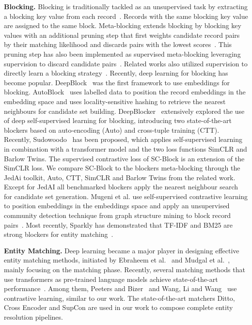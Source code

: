 \documentclass[sigconf,nonacm]{acmart}
\begin{document}
\vspace{.05cm}\noindent\textbf{Blocking.}
Blocking is traditionally tackled as an unsupervised task by extracting a blocking key value from each record~\cite{christen_survey_2012, aizawa_fast_2005}. Records with the same blocking key value are assigned to the same block. Meta-blocking extends blocking by blocking key values with an additional pruning step that first weights candidate record pairs by their matching likelihood and discards pairs with the lowest scores~\cite{efthymiou_parallel_2017}. This pruning step has also been implemented as supervised meta-blocking leveraging supervision to discard candidate pairs~\cite{gagliardelli_generalized_2022,papadakis_supervised_2014}.
Related works also utilized supervision to directly learn a blocking strategy~\cite{bilenko_adaptive_2006, zhang_autoblock_2020}.
Recently, deep learning for blocking has become popular. DeepBlock~\cite{javdani_deepblock_2019} was the first framework to use embeddings for blocking. 
AutoBlock~\cite{zhang_autoblock_2020} uses labelled data to position the record embeddings in the embedding space and uses locality-sensitive hashing to retrieve the nearest neighbours for candidate set building. 
DeepBlocker~\cite{thirumuruganathan_deep_2021} extensively explored the use of deep self-supervised learning for blocking, introducing two state-of-the-art blockers based on auto-encoding (Auto) and cross-tuple training (CTT).
Recently, Sudowoodo~\cite{wang_sudowoodo_2022} has been proposed, which applies self-supervised learning in combination with a transformer model and the two loss functions SimCLR and Barlow Twins.
The supervised contrastive loss of SC-Block is an extension of the SimCLR loss.
We compare SC-Block to the blockers meta-blocking through the JedAi toolkit, Auto, CTT, SimCLR and Barlow Twins from the related work.
Except for JedAI all benchmarked blockers apply the nearest neighbour search for candidate set generation.
Mugeni et al. use self-supervised contrastive learning to position embeddings in the embeddings space and apply an unsupervised community detection technique from graph structure mining to block record pairs~\cite{mugeni_graph-based_2022}.
Most recently, Sparkly has demonstrated that TF-IDF and BM25 are strong blockers for entity matching~\cite{paulsen_sparkly_2023}.

\vspace{.05cm}\noindent\textbf{Entity Matching.}
Deep learning became a major player in designing effective entity matching methods, initiated by Ebraheem et al.~\cite{ebraheem_distributed_2018} 
and Mudgal et al.~\cite{mudgal_deep_2018}, mainly focusing on the matching phase. 
Recently, several matching methods that use transformers as pre-trained language models achieve state-of-the-art performance~\cite{li_deep_2020,brunner_entity_2020, peeters_dual-objective_2021}.
Among them, Peeters and Bizer~\cite{peeters_supervised_2022} and Wang, Li and Wang~\cite{wang_sudowoodo_2022} use contrastive learning, similar to our work. 
The state-of-the-art matchers Ditto, Cross Encoder and SupCon are used in our work to compose complete entity resolution pipelines.
\end{document}
